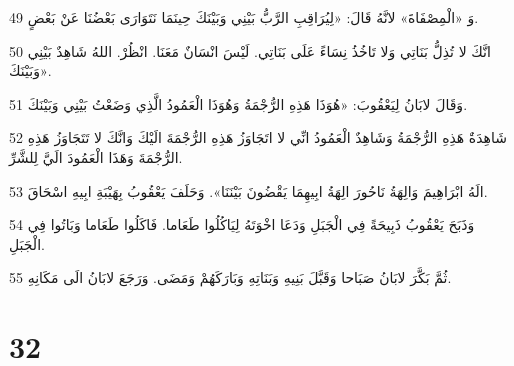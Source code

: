 \par 49 وَ «الْمِصْفَاةَ» لانَّهُ قَالَ: «لِيُرَاقِبِ الرَّبُّ بَيْنِي وَبَيْنَكَ حِينَمَا نَتَوَارَى بَعْضُنَا عَنْ بَعْضٍ.
\par 50 انَّكَ لا تُذِلُّ بَنَاتِي وَلا تَاخُذُ نِسَاءً عَلَى بَنَاتِي. لَيْسَ انْسَانٌ مَعَنَا. انْظُرْ. اللهُ شَاهِدٌ بَيْنِي وَبَيْنَكَ».
\par 51 وَقَالَ لابَانُ لِيَعْقُوبَ: «هُوَذَا هَذِهِ الرُّجْمَةُ وَهُوَذَا الْعَمُودُ الَّذِي وَضَعْتُ بَيْنِي وَبَيْنَكَ.
\par 52 شَاهِدَةٌ هَذِهِ الرُّجْمَةُ وَشَاهِدٌ الْعَمُودُ انِّي لا اتَجَاوَزُ هَذِهِ الرُّجْمَةَ الَيْكَ وَانَّكَ لا تَتَجَاوَزُ هَذِهِ الرُّجْمَةَ وَهَذَا الْعَمُودَ الَيَّ لِلشَّرِّ.
\par 53 الَهُ ابْرَاهِيمَ وَالِهَةُ نَاحُورَ الِهَةُ ابِيهِمَا يَقْضُونَ بَيْنَنَا». وَحَلَفَ يَعْقُوبُ بِهَيْبَةِ ابِيهِ اسْحَاقَ.
\par 54 وَذَبَحَ يَعْقُوبُ ذَبِيحَةً فِي الْجَبَلِ وَدَعَا اخْوَتَهُ لِيَاكُلُوا طَعَاما. فَاكَلُوا طَعَاما وَبَاتُوا فِي الْجَبَلِ.
\par 55 ثُمَّ بَكَّرَ لابَانُ صَبَاحا وَقَبَّلَ بَنِيهِ وَبَنَاتِهِ وَبَارَكَهُمْ وَمَضَى. وَرَجَعَ لابَانُ الَى مَكَانِهِ.

\chapter{32}

